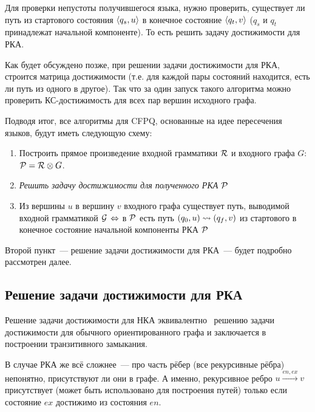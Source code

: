 Для проверки непустоты получившегося языка, нужно проверить, существует ли путь из стартового состояния $\langle q_s, u \rangle$ в конечное состояние $\langle q_t, v \rangle$ ($q_s$ и $q_t$ принадлежат начальной компоненте). То есть решить задачу достижимости для РКА.

Как будет обсуждено позже, при решении задачи достижимости для РКА, строится матрица достижимости (т.е. для каждой пары состояний находится, есть ли путь из одного в другое). Так что за один запуск такого алгоритма можно проверить КС-достижимость для всех пар вершин исходного графа. 

Подводя итог, все алгоритмы для CFPQ, основанные на идее пересечения языков, будут иметь следующую схему:
\begin{enumerate}
    \item Построить прямое произведение входной грамматики $\mathcal{R}$ и входного графа $G$: $\mathcal{P} = \mathcal{R} \otimes G$.
    \item \textit{Решить задачу достижимости для полученного РКА $\mathcal{P}$}
    \item Из вершины $u$ в вершину $v$ входного графа существует путь, выводимой входной грамматикой $\mathcal{G}$ $\Leftrightarrow$ в $\mathcal{P}$ есть путь $(q_0, u) \rightsquigarrow (q_f, v)$ из стартового в конечное состояние начальной компоненты РКА $\mathcal{P}$
\end{enumerate}

Второй пункт~--- решение задачи достижимости для РКА~--- будет подробно рассмотрен далее.

\subsection{Решение задачи достижимости для РКА}

Решение задачи достижимости для НКА эквивалентно~\cite{Yannakakis1990} решению задачи достижимости для обычного ориентированного графа и заключается в построении транзитивного замыкания.

\begin{definition}\label{def:TC}
  \TODO
\end{definition}

В случае РКА же всё сложнее~--- про часть рёбер (все рекурсивные рёбра) непонятно, присутствуют ли они в графе. А именно, рекурсивное ребро $u \xrightarrow{en, ex} v$ присутствует (может быть использовано для построения путей) только если состояние $ex$ достижимо из состояния $en$.

